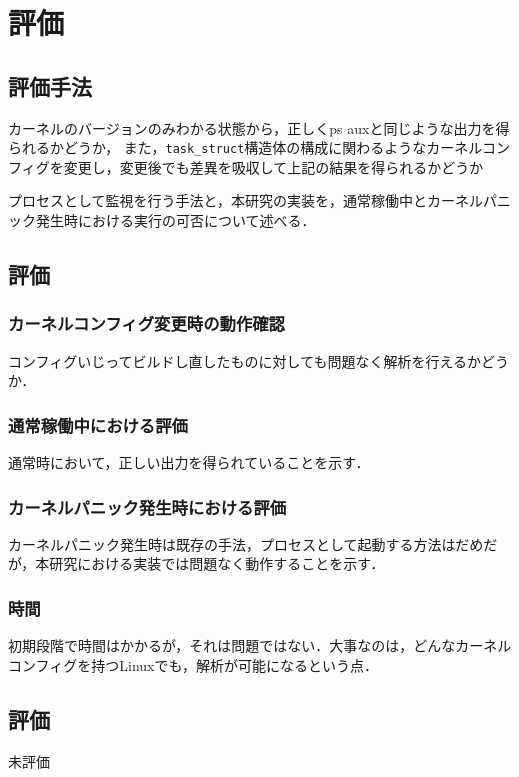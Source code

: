 \chapter{評価}
\label{chap:evaluation}

\section{評価手法}

カーネルのバージョンのみわかる状態から，正しくps auxと同じような出力を得られるかどうか，
また，\verb|task_struct|構造体の構成に関わるようなカーネルコンフィグを変更し，変更後でも差異を吸収して上記の結果を得られるかどうか

プロセスとして監視を行う手法と，本研究の実装を，通常稼働中とカーネルパニック発生時における実行の可否について述べる．

\section{評価}

\subsection{カーネルコンフィグ変更時の動作確認}

コンフィグいじってビルドし直したものに対しても問題なく解析を行えるかどうか．

\subsection{通常稼働中における評価}

通常時において，正しい出力を得られていることを示す．

\subsection{カーネルパニック発生時における評価}

カーネルパニック発生時は既存の手法，プロセスとして起動する方法はだめだが，本研究における実装では問題なく動作することを示す．

\subsection{時間}

初期段階で時間はかかるが，それは問題ではない．大事なのは，どんなカーネルコンフィグを持つLinuxでも，解析が可能になるという点．

\section{評価}

未評価

